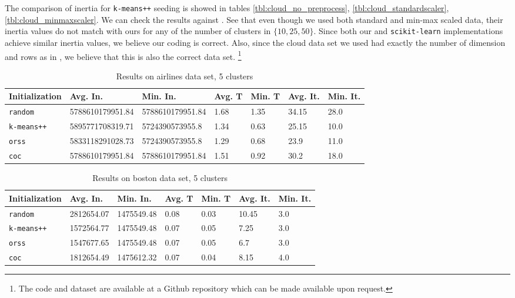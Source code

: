 \documentclass[12pt]{article}
\begin{document}
	The comparison of inertia for \texttt{k-means++} seeding is showed in tables \ref{tbl:cloud_no_preprocess}, \ref{tbl:cloud_standardscaler}, \ref{tbl:cloud_minmaxscaler}. We can check the results against \textcite[Table $3$]{arthur_vassilvitskii_2007}. See that even though we used both standard and min-max scaled data, their inertia values do not match with ours for any of the number of clusters in $\{10,25,50\}$. Since both our and \texttt{scikit-learn} implementations achieve similar inertia values, we believe our coding is correct. Also, since the cloud data set we used had exactly the number of dimension and rows as in \textcite{arthur_vassilvitskii_2007}, we believe that this is also the correct data set. \footnote{The code and dataset are available at a Github repository which can be made available upon request.}
		\begin{table}[p]
			\begin{center}
				\begin{tabular}{|l|l|l|l|l|l|l|}
					\hline
					Initialization & Avg. In. & Min. In. & Avg. T & Min. T & Avg. It. & Min. It.\\\hline
					\texttt{random} & 5788610179951.84 & 5788610179951.84 & 1.68 & 1.35 & 34.15 & 28.0\\\hline
					\texttt{k-means++} & 5895771708319.71 & 5724390573955.8 & 1.34 & 0.63 & 25.15 & 10.0\\\hline
					\texttt{orss} & 5833118291028.73 & 5724390573955.8 & 1.29 & 0.68 & 23.9 & 11.0\\\hline
					\texttt{coc} & 5788610179951.84 & 5788610179951.84 & 1.51 & 0.92 & 30.2 & 18.0\\\hline
				\end{tabular}
				\caption{Results on airlines data set, 5 clusters}
				\label{tbl:airlines5}
			\end{center}
		\end{table}

		\begin{table}[p]
			\begin{center}
				\begin{tabular}{|l|l|l|l|l|l|l|}
					\hline
					Initialization & Avg. In. & Min. In. & Avg. T & Min. T & Avg. It. & Min. It.\\\hline
					\texttt{random} & 2812654.07 & 1475549.48 & 0.08 & 0.03 & 10.45 & 3.0\\\hline
					\texttt{k-means++} & 1572564.77 & 1475549.48 & 0.07 & 0.05 & 7.25 & 3.0\\\hline
					\texttt{orss} & 1547677.65 & 1475549.48 & 0.07 & 0.05 & 6.7 & 3.0\\\hline
					\texttt{coc} & 1812654.49 & 1475612.32 & 0.07 & 0.04 & 8.15 & 4.0\\\hline
				\end{tabular}
				\caption{Results on boston data set, 5 clusters}
				\label{tbl:boston5}
			\end{center}
		\end{table}
\end{document}
